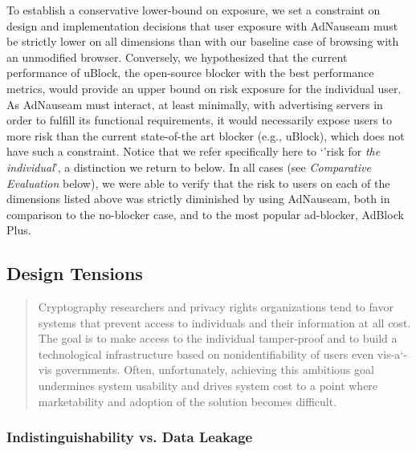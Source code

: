 \documentclass[conference]{IEEEtran}
\begin{document}
To establish a conservative lower-bound on exposure, we set a constraint on design and implementation decisions that user exposure with AdNauseam must be strictly lower on all dimensions than with our baseline case of browsing with an unmodified browser. Conversely, we hypothesized that the current performance of uBlock, the open-source blocker with the best performance metrics, would provide an upper bound on risk exposure for the individual user. As AdNauseam must interact, at least minimally, with advertising servers in order to fulfill its functional requirements, it would necessarily expose users to more risk than the current state-of-the art blocker (e.g., uBlock), which does not have such a constraint. Notice that we refer specifically here to `'risk for \emph{the individual}', a distinction we return to below. In all cases (see \emph{Comparative Evaluation} below), we were able to verify that the risk to users on each of the dimensions listed above was strictly diminished by using AdNauseam, both in comparison to the no-blocker case, and to the most popular ad-blocker, AdBlock Plus\cite{PageFair}.

\subsection{Design Tensions}

\blockquote{Cryptography researchers and privacy rights organizations tend to favor systems that prevent access to individuals and their information at all cost. The goal is to make access to the individual tamper-proof and to build a technological infrastructure based on nonidentifiability of users even vis-a`-vis governments. Often, unfortunately, achieving this ambitious goal undermines system usability and drives system cost to a point where marketability and adoption of the solution becomes difficult.}\cite{Spiekermann}

\subsubsection{Indistinguishability vs. Data Leakage}
\end{document}
